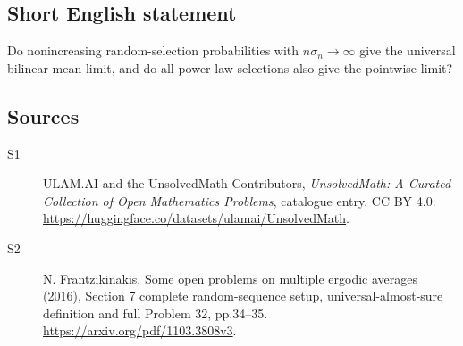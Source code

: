 \documentclass[11pt]{article}
\begin{document}
\subsection{Short English statement}
Do nonincreasing random-selection probabilities with $n\sigma_n\to\infty$ give the universal bilinear mean limit, and do all power-law selections also give the pointwise limit?
\subsection{Sources}
\begin{description}
\item[\hypertarget{source:statement:1}{S1}] ULAM.AI and the UnsolvedMath Contributors, \emph{UnsolvedMath: A Curated Collection of Open Mathematics Problems}, catalogue entry. CC BY 4.0. \url{https://huggingface.co/datasets/ulamai/UnsolvedMath}.
\item[\hypertarget{source:statement:2}{S2}] N. Frantzikinakis, Some open problems on multiple ergodic averages (2016), Section 7 complete random-sequence setup, universal-almost-sure definition and full Problem 32, pp.34--35. \url{https://arxiv.org/pdf/1103.3808v3}.
\end{description}
\label{end:statement}
\end{document}
